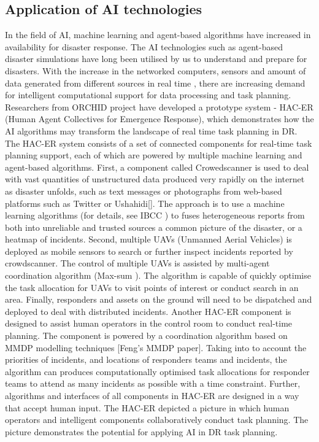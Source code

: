 \subsection{Application of AI technologies}\label{sec:lraisupport}
In the field of AI, machine learning and agent-based algorithms have increased in availability for disaster response. The AI technologies such as agent-based disaster simulations \cite{Okaya} have long been utilised by us to understand and prepare for disasters. With the increase in the networked computers, sensors and amount of data generated from different sources in real time \cite{Ramchurn}, there are increasing demand for intelligent computational support for data processing and task planning. Researchers from ORCHID project have developed a prototype system - HAC-ER (Human Agent Collectives for Emergence Response), which demonstrates how the AI algorithms may transform the landscape of real time task planning in DR.\\

The HAC-ER system consists of a set of connected components for real-time task planning support, each of which are powered by multiple machine learning and agent-based algorithms. First, a component called Crowedscanner is used to deal with vast quantities of unstructured data produced very rapidly on the internet as disaster unfolds, such as text messages or photographs from web-based platforms such as Twitter or Ushahidi[]. The approach is to use a machine learning algorithms (for details, see IBCC \cite{Simpson}) to fuses heterogeneous reports from both into unreliable and trusted sources a common picture of the disaster, or a heatmap of incidents. Second, multiple  UAVs (Unmanned Aerial Vehicles) is deployed as mobile sensors to search or further inspect incidents reported by crowdscanner. The control of multiple UAVs is assisted by multi-agent coordination algorithm (Max-sum \cite{Ramchurn2010}). The algorithm is capable of quickly optimise the task allocation for UAVs to visit points of interest or conduct search in an area.  Finally, responders and assets on the ground will need to be dispatched and deployed to deal with distributed incidents. Another HAC-ER component is designed to assist human operators in the control room to conduct real-time planning. The component is powered by a coordination algorithm based on MMDP modelling techniques [Feng's MMDP paper]. Taking into to account the priorities of incidents, and locations of responders teams and incidents, the algorithm can produces computationally optimised task allocations for responder teams to attend as many incidents as possible with a time constraint. Further, algorithms and interfaces of all components in HAC-ER are designed in a way that accept human input. The HAC-ER depicted a picture in which human operators and intelligent components collaboratively conduct task planning. The picture demonstrates the potential for applying AI in DR task planning.\\

